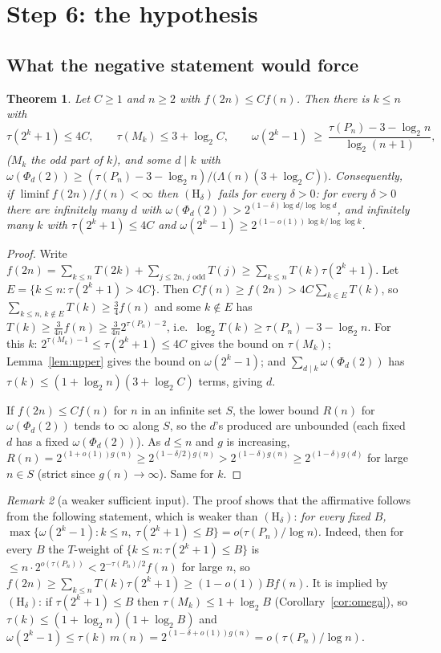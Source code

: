 \documentclass[11pt]{article}
\newtheorem{theorem}{Theorem}
\theoremstyle{remark}
\newtheorem{remark}[theorem]{Remark}
\begin{document}
\section{Step 6: the hypothesis}

\subsection{What the negative statement would force}

\begin{theorem}\label{thm:converse}
Let $C\ge1$ and $n\ge2$ with $f(2n)\le Cf(n)$. Then there is $k\le n$ with
\[
  \tau(2^k+1)\le4C,\qquad \tau(M_k)\le3+\log_2C,\qquad
  \omega(2^k-1)\ \ge\ \frac{\tau(P_n)-3-\log_2n}{\log_2(n+1)},
\]
($M_k$ the odd part of $k$), and some $d\mid k$ with
$\omega(\Phi_d(2))\ge(\tau(P_n)-3-\log_2n)/\big(\Lambda(n)(3+\log_2C)\big)$.
Consequently, if $\liminf f(2n)/f(n)<\infty$ then $(\mathrm H_\delta)$ fails for every
$\delta>0$: for every $\delta>0$ there are infinitely many $d$ with
$\omega(\Phi_d(2))>2^{(1-\delta)\log d/\log\log d}$, and infinitely many $k$ with
$\tau(2^k+1)\le 4C$ and $\omega(2^k-1)\ge2^{(1-o(1))\log k/\log\log k}$.
\end{theorem}
\begin{proof}
Write $f(2n)=\sum_{k\le n}T(2k)+\sum_{j\le2n,\,j\text{ odd}}T(j)\ge\sum_{k\le n}T(k)\tau(2^k+1)$. Let
$E=\{k\le n:\tau(2^k+1)>4C\}$. Then $Cf(n)\ge f(2n)>4C\sum_{k\in E}T(k)$, so
$\sum_{k\le n,\,k\notin E}T(k)\ge\frac34f(n)$ and some $k\notin E$ has
$T(k)\ge\frac{3}{4n}f(n)\ge\frac3{4n}2^{\tau(P_n)-2}$, i.e.\
$\log_2T(k)\ge\tau(P_n)-3-\log_2n$. For this $k$: $2^{\tau(M_k)-1}\le\tau(2^k+1)\le4C$ gives the
bound on $\tau(M_k)$; Lemma~\ref{lem:upper} gives the bound on $\omega(2^k-1)$; and
$\sum_{d\mid k}\omega(\Phi_d(2))$ has $\tau(k)\le(1+\log_2n)(3+\log_2C)$ terms, giving $d$.

If $f(2n)\le Cf(n)$ for $n$ in an infinite set $S$, the lower bound $R(n)$ for
$\omega(\Phi_d(2))$ tends to $\infty$ along $S$, so the $d$'s produced are unbounded (each fixed $d$
has a fixed $\omega(\Phi_d(2))$). As $d\le n$ and $g$ is increasing,
$R(n)=2^{(1+o(1))g(n)}\ge2^{(1-\delta/2)g(n)}>2^{(1-\delta)g(n)}\ge2^{(1-\delta)g(d)}$ for large
$n\in S$ (strict since $g(n)\to\infty$). Same for $k$.
\end{proof}

\begin{remark}[a weaker sufficient input]
The proof shows that the affirmative follows from the following statement, which is weaker than
$(\mathrm H_\delta)$: \emph{for every fixed $B$, $\max\{\omega(2^k-1):k\le n,\ \tau(2^k+1)\le B\}
=o\big(\tau(P_n)/\log n\big)$.} Indeed, then for every $B$ the $T$-weight of
$\{k\le n:\tau(2^k+1)\le B\}$ is $\le n\cdot 2^{o(\tau(P_n))}<2^{-\tau(P_n)/2}f(n)$ for large $n$,
so $f(2n)\ge\sum_{k\le n}T(k)\tau(2^k+1)\ge(1-o(1))Bf(n)$. It is implied by
$(\mathrm H_\delta)$: if $\tau(2^k+1)\le B$ then $\tau(M_k)\le1+\log_2B$ (Corollary~\ref{cor:omega}),
so $\tau(k)\le(1+\log_2n)(1+\log_2B)$ and
$\omega(2^k-1)\le\tau(k)\,m(n)=2^{(1-\delta+o(1))g(n)}=o(\tau(P_n)/\log n)$.
\end{remark}
\end{document}
